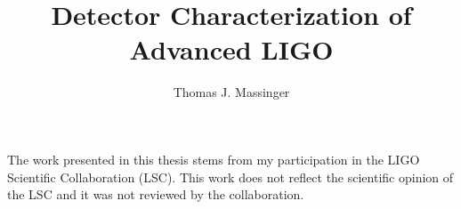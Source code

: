 \documentclass[12pt,notitlepage]{report}
\newcommand{\prd}{{\it Phys. Rev. D}}
\begin{document}
\title{Detector Characterization of Advanced LIGO}
\author{Thomas J. Massinger}
\havededicationtrue
\dedication{Well that was fun.}
\haveminorfalse
\copyrighttrue
\doctoratetrue
\figurespagetrue
\tablespagetrue
\electronicsubmitfalse


\Acknowledgments{
}

\beforepreface

The work presented in this thesis stems from my participation in the LIGO
Scientific Collaboration (LSC). This work does not reflect the
scientific opinion of the LSC and it was not reviewed by the collaboration.



%
%
%
%
%
%
%


\afterpreface

\label{ch:introduction}


\label{ch:o1results}


\label{ch:instrumentalDetchar}


\label{ch:IMCUpconversion}


\label{ch:ODC}


\label{ch:Vetoes}


\label{ch:CBCDetCharBackground}

\end{document}
